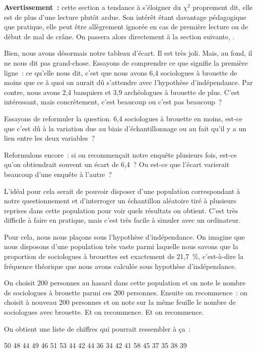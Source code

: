 \documentclass[a4paper,10pt,twoside,francais]{report}
\newcommand{\chid}{$\chi^2$\xspace}
\begin{document}
\textbf{Avertissement~:} cette section a tendance à s'éloigner du
\chid proprement dit, elle est de plus d'une lecture plutôt ardue. Son
intérêt étant davantage pédagogique que pratique, elle peut être
allègrement ignorée en cas de première lecture ou de début de mal de
crâne. On passera alors directement à la section suivante,
.

Bien, nous avons désormais notre tableau d'écart. Il est très
joli. Mais, au fond, il ne nous dit pas grand-chose. Essayons de
comprendre ce que signifie la première ligne~: ce qu'elle nous dit,
c'est que nous avons 6,4 sociologues à brouette de moins que ce à quoi
on aurait dû s'attendre avec l'hypothèse d'indépendance. Par contre,
nous avons 2,4 banquiers et 3,9 archéologues à brouette de plus. C'est
intéressant, mais concrètement, c'est beaucoup ou c'est pas beaucoup~?

Essayons de reformuler la question. 6,4 sociologues à brouette en
moins, est-ce que c'est dû à la variation due au biais
d'échantillonnage ou au fait qu'il y a un lien entre les deux
variables~?

Reformulons encore~: si on recommençait notre enquête plusieurs fois,
est-ce qu'on obtiendrait souvent un écart de 6,4~? Ou est-ce que
l'écart varierait beaucoup d'une enquête à l'autre~?

L'idéal pour cela serait de pouvoir disposer d'une population
correspondant à notre questionnement et d'interroger un échantillon
aléatoire tiré à plusieurs reprises dans cette population pour voir
quels résultats on obtient. C'est très difficile à faire en pratique,
mais c'est très facile à simuler avec un ordinateur.

Pour cela, nous nous plaçons sous l'hypothèse d'indépendance. On
imagine que nous disposons d'une population très vaste parmi laquelle
nous savons que la proportion de sociologues à brouettes est
exactement de 21,7~\%, c'est-à-dire la fréquence théorique que nous
avons calculée sous hypothèse d'indépendance.

On choisit 200 personnes au hasard dans cette population et on note le
nombre de sociologues à brouette parmi ces 200 personnes. Ensuite on
recommence~: on choisit à nouveau 200 personnes et on note sur la même
feuille le nombre de sociologues avec brouette. Et on recommence. Et
on recommence.

On obtient une liste de chiffres qui pourrait ressembler à ça~:

\begin{center}
  50 48 44 49 46 51 53 44 42 44 36 34 42 41 58 45 37 35 38 39
\end{center}
\end{document}
